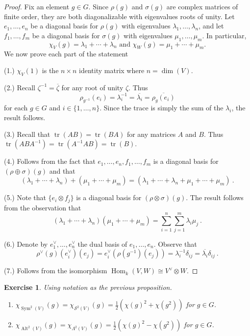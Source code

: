 \documentclass[12pt]{article}
\theoremstyle{plain}
\newtheorem{exercise}[theorem]{Exercise}
\theoremstyle{definition}
\theoremstyle{remark}
\numberwithin{equation}{section}
\begin{document}
\begin{proof}
Fix an element $g \in G$.
Since $\rho(g)$ and $\sigma(g)$ are complex matrices of finite order,
they are both diagonalizable with eigenvalues roots of unity.
Let $e_1,\ldots,e_n$ be a diagonal basis for $\rho(g)$
with eigenvalues $\lambda_1, \ldots, \lambda_n$, and
let $f_1, \ldots, f_m$ be a diagonal basis for $\sigma(g)$
with eigenvalues $\mu_1, \ldots, \mu_m$.
In particular,
\[
\chi_V(g) = \lambda_1 + \cdots + \lambda_n \textrm{ and }
\chi_W(g) = \mu_1 + \cdots + \mu_m.
\]
We now prove each part of the statement

(1.)
$\chi_V(1)$ is the $n \times n$ identity matrix where $n=\dim(V)$.


(2.)
Recall $\zeta^{-1}=\overline{\zeta}$ for any root of unity
$\zeta$.
Thus
\[
\rho_{g^{-1}}(e_i)=\lambda_i^{-1}=\overline{\lambda_i}=\overline{\rho_g(e_i)}
\]
for each $g \in G$ and $i \in \{1,\ldots,n\}$.
Since the trace is simply the sum of the $\lambda_i$, the result
follows.

(3.) Recall that $\operatorname{tr}(AB)=\operatorname{tr}(BA)$ for any
matrices $A$ and $B$.  Thus
$\operatorname{tr}(ABA^{-1})=\operatorname{tr}(A^{-1}AB)=\operatorname{tr}(B)$.



(4.) Follows from the fact that $e_1, \ldots, e_n, f_1, \ldots, f_m$ is a
diagonal basis for $(\rho \oplus \sigma)(g)$ and that
\[
(\lambda_1 + \cdots + \lambda_n) + (\mu_1 + \cdots + \mu_m) = 
(\lambda_1 + \cdots + \lambda_n + \mu_1 + \cdots + \mu_m) \ .
\]



(5.) Note that $\{ e_i \otimes f_j \}$ is a diagonal basis for
$(\rho \otimes \sigma)(g)$.  The result follows from the observation
that
\[
(\lambda_1 + \cdots + \lambda_n) (\mu_1 + \cdots + \mu_m)
= \sum_{i=1}^n \sum_{j=1}^m \lambda_i \mu_j \ .
\]



(6.) Denote by $e_1^\vee, \ldots, e_n^\vee$ the dual basis of $e_1,
\ldots, e_n$.
Observe that
\[
\rho^\vee(g)(e_i^\vee)(e_j)=e_i^\vee(\rho(g^{-1})(e_j))
= \lambda_i^{-1}\delta_{ij}=\overline{\lambda_i}\delta_{ij} \ .
\]



(7.) Follows from the isomorphism
$\operatorname{Hom}_k(V,W) \cong V^\vee \otimes W$.
\end{proof}


\begin{exercise}
Using notation as the previous proposition.
\begin{enumerate}
\item $\displaystyle
\chi_{\operatorname{Sym}^2(V)}(g)=
\chi_{\mathcal{S}^2(V)}(g)
=  \frac{1}{2}\left(\chi(g)^2 + \chi(g^2)\right)$ for $g \in G$.
\item $\displaystyle
\chi_{\operatorname{Alt}^2(V)}(g)=
\chi_{\Lambda^2(V)}(g)
=  \frac{1}{2}\left(\chi(g)^2 - \chi(g^2)\right)$ for $g \in G$.
\end{enumerate}
\end{exercise}
\end{document}
